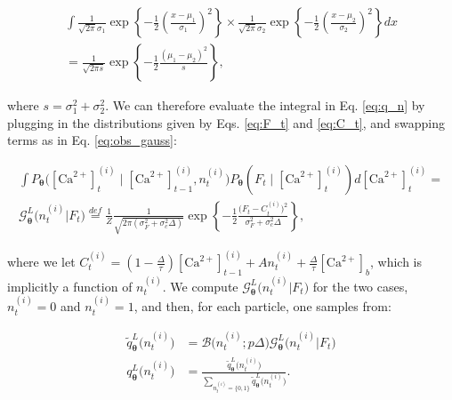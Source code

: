 \documentclass[10pt]{article}
\providecommand{\ve}[1]{\boldsymbol{#1}}
\providecommand{\ve}[1]{\boldsymbol{#1}}
\newcommand{\thetn}{\ve{\theta}}
\newcommand{\p}{P_{\thetn}}
\newcommand{\Ca}{[\text{Ca}^{2+}]}
\begin{document}
\begin{multline} \label{eq:gauss_rule}
\int \frac{1}{\sqrt{2 \pi} \sigma_1} \exp\left\{-\frac{1}{2} \left(\frac{x-\mu_1}{\sigma_1}\right)^2\right\} \times \frac{1}{\sqrt{2 \pi} \sigma_2} \exp\left\{-\frac{1}{2} \left(\frac{x-\mu_2}{\sigma_2}\right)^2\right\} dx
\\ =\frac{1}{\sqrt{2 \pi s}} \exp\left\{-\frac{1}{2}\frac{(\mu_1 - \mu_2)^2}{s}\right\},
\end{multline}

\noindent where $s=\sigma_1^2 + \sigma_2^2$. We can therefore evaluate the integral in Eq. \ref{eq:q_n} by plugging in the distributions given by Eqs. \ref{eq:F_t} and \ref{eq:C_t}, and swapping terms as in Eq. \ref{eq:obs_gauss}:

\begin{multline} \label{eq:q_n_lin}
\int \p \big( \Ca_t^{(i)} \mid \Ca^{(i)}_{t-1}, n_t^{(i)} \big) \p(F_t \mid \Ca_t^{(i)}) d\Ca_t^{(i)} =   
\\ 
\mathcal{G}_{\thetn}^L\big(n_t^{(i)} | F_t\big)  \stackrel{def}{=} \frac{1}{Z} \frac{1}{\sqrt{2 \pi (\sigma_F^2 + \sigma_c^2 \Delta)}} \exp \left\{-\frac{1}{2}\frac{\big(F_t - C_t^{(i)} \big)^2}{\sigma_F^2 + \sigma_c^2 \Delta}\right\}, 
\end{multline}

\noindent where we let $C_t^{(i)}=(1-\frac{\Delta}{\tau}) \Ca_{t-1}^{(i)} + A n_t^{(i)} + \frac{\Delta}{\tau} \Ca_b$, which is implicitly a function of $n_t^{(i)}$.  We compute $\mathcal{G}_{\thetn}^L\big(n_t^{(i)} | F_t \big)$ for the two cases, $n_t^{(i)}=0$ and $n_t^{(i)}=1$, and then, for each particle, one samples from:

\begin{subequations} \label{aeq:qn2}
\begin{align}
\widetilde{q}_{\thetn}^L\big(n_t^{(i)}\big)&=\mathcal{B}\big(n_t^{(i)}; p \Delta\big) \mathcal{G}_{\thetn}^L \big(n_t^{(i)} | F_t \big)\\
q_{\thetn}^L\big(n_t^{(i)}\big)&=\frac{\widetilde{q}_{\thetn}^L\big(n_t^{(i)}\big)}{\sum_{n_t^{(i)}=\{0,1\}} \widetilde{q}_{\thetn}^L\big(n_t^{(i)}\big)}.
\end{align}
\end{subequations}
\end{document}
